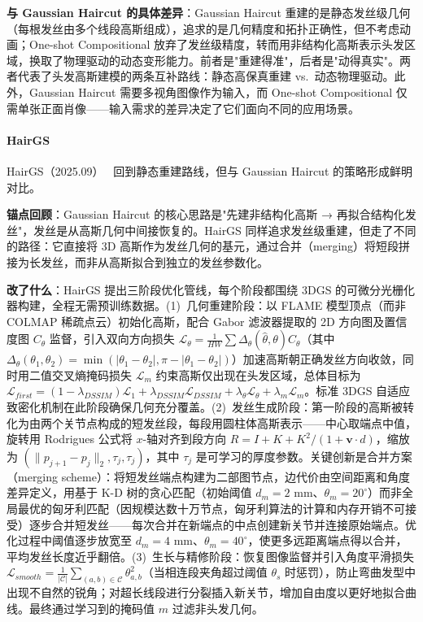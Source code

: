 \textbf{与 Gaussian Haircut 的具体差异}：Gaussian Haircut 重建的是静态发丝级几何（每根发丝由多个线段高斯组成），追求的是几何精度和拓扑正确性，但不考虑动画；One-shot Compositional 放弃了发丝级精度，转而用非结构化高斯表示头发区域，换取了物理驱动的动态变形能力。前者是"重建得准"，后者是"动得真实"。两者代表了头发高斯建模的两条互补路线：静态高保真重建 vs.~动态物理驱动。此外，Gaussian Haircut 需要多视角图像作为输入，而 One-shot Compositional 仅需单张正面肖像——输入需求的差异决定了它们面向不同的应用场景。

\paragraph{HairGS}

HairGS（2025.09）~\cite{2509_07774} 回到静态重建路线，但与 Gaussian Haircut 的策略形成鲜明对比。

\textbf{锚点回顾}：Gaussian Haircut 的核心思路是"先建非结构化高斯 → 再拟合结构化发丝"，发丝是从高斯几何中间接恢复的。HairGS 同样追求发丝级重建，但走了不同的路径：它直接将 3D 高斯作为发丝几何的基元，通过合并（merging）将短段拼接为长发丝，而非从高斯拟合到独立的发丝参数化。

\textbf{改了什么}：HairGS 提出三阶段优化管线，每个阶段都围绕 3DGS 的可微分光栅化器构建，全程无需预训练数据。(1)~几何重建阶段：以 FLAME 模型顶点（而非 COLMAP 稀疏点云）初始化高斯，配合 Gabor 滤波器提取的 2D 方向图及置信度图 $C_\theta$ 监督，引入双向方向损失 $\mathcal{L}_\theta = \frac{1}{HW}\sum \Delta_\theta(\hat{\theta}, \theta) C_\theta$（其中 $\Delta_\theta(\theta_1, \theta_2) = \min(|\theta_1 - \theta_2|, \pi - |\theta_1 - \theta_2|)$）加速高斯朝正确发丝方向收敛，同时用二值交叉熵掩码损失 $\mathcal{L}_m$ 约束高斯仅出现在头发区域，总体目标为 $\mathcal{L}_{first} = (1 - \lambda_{DSSIM})\mathcal{L}_1 + \lambda_{DSSIM}\mathcal{L}_{DSSIM} + \lambda_\theta \mathcal{L}_\theta + \lambda_m \mathcal{L}_m$。标准 3DGS 自适应致密化机制在此阶段确保几何充分覆盖。(2)~发丝生成阶段：第一阶段的高斯被转化为由两个关节点构成的短发丝段，每段用圆柱体高斯表示——中心取端点中值，旋转用 Rodrigues 公式将 $x$-轴对齐到段方向 $R = I + K + K^2/(1 + \mathbf{v} \cdot d)$，缩放为 $(\|p_{j+1} - p_j\|_2, \tau_j, \tau_j)$，其中 $\tau_j$ 是可学习的厚度参数。关键创新是合并方案（merging scheme）：将短发丝端点构建为二部图节点，边代价由空间距离和角度差异定义，用基于 K-D 树的贪心匹配（初始阈值 $d_m = 2$ mm、$\theta_m = 20^\circ$）而非全局最优的匈牙利匹配（因规模达数十万节点，匈牙利算法的计算和内存开销不可接受）逐步合并短发丝——每次合并在新端点的中点创建新关节并连接原始端点。优化过程中阈值逐步放宽至 $d_m = 4$ mm、$\theta_m = 40^\circ$，使更多远距离端点得以合并，平均发丝长度近乎翻倍。(3)~生长与精修阶段：恢复图像监督并引入角度平滑损失 $\mathcal{L}_{smooth} = \frac{1}{|\mathcal{C}|}\sum_{(a,b) \in \mathcal{C}} \theta_{a,b}^2$（当相连段夹角超过阈值 $\theta_s$ 时惩罚），防止弯曲发型中出现不自然的锐角；对超长线段进行分裂插入新关节，增加自由度以更好地拟合曲线。最终通过学习到的掩码值 $m$ 过滤非头发几何。

